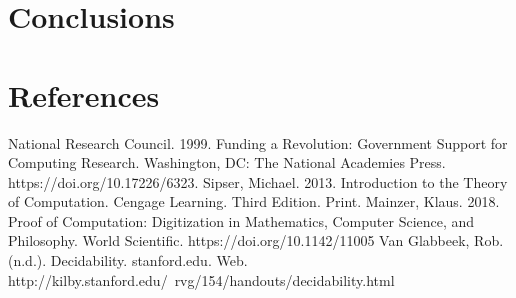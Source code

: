 \documentclass{article}
\begin{document}
\section{Conclusions}

\section{References}
\begin{thebibliography}{100}
	 National Research Council. 1999. Funding a Revolution: Government Support for Computing Research. Washington, DC: The National Academies Press. https://doi.org/10.17226/6323.
	 Sipser, Michael. 2013. Introduction to the Theory of Computation. Cengage Learning. Third Edition. Print.
	 Mainzer, Klaus. 2018. Proof of Computation: Digitization in Mathematics, Computer Science, and Philosophy. World Scientific. https://doi.org/10.1142/11005
	 Van Glabbeek, Rob. (n.d.). Decidability. stanford.edu. Web. http://kilby.stanford.edu/~rvg/154/handouts/decidability.html
\end{thebibliography}
\end{document}
